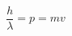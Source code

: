 \documentclass[../main.tex]{subfiles}%
\begin{document}
%
    \Xequation%
    \begin{equation}%
         \dfrac{h}{\lambda} = p = mv%
        \label{eq:momentum-definition}%
    \end{equation}%
\end{document}
